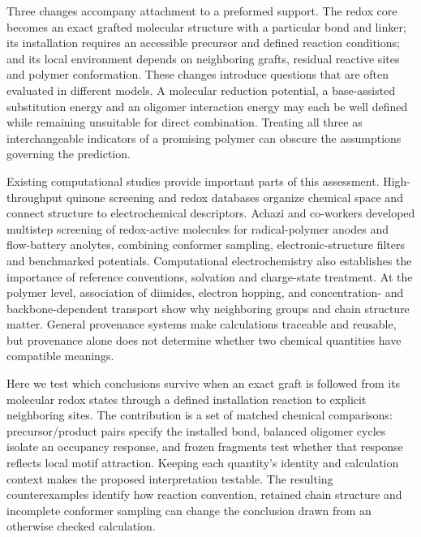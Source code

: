 \documentclass[11pt]{article}
\begin{document}
Three changes accompany attachment to a preformed support. The redox core becomes an exact grafted molecular structure with a particular bond and linker; its installation requires an accessible precursor and defined reaction conditions; and its local environment depends on neighboring grafts, residual reactive sites and polymer conformation. These changes introduce questions that are often evaluated in different models. A molecular reduction potential, a base-assisted substitution energy and an oligomer interaction energy may each be well defined while remaining unsuitable for direct combination. Treating all three as interchangeable indicators of a promising polymer can obscure the assumptions governing the prediction.

Existing computational studies provide important parts of this assessment. High-throughput quinone screening and redox databases organize chemical space and connect structure to electrochemical descriptors.\cite{er2015,d3tales2023,reddb2022} Achazi and co-workers developed multistep screening of redox-active molecules for radical-polymer anodes and flow-battery anolytes, combining conformer sampling, electronic-structure filters and benchmarked potentials.\cite{achazi2024screening} Computational electrochemistry also establishes the importance of reference conventions, solvation and charge-state treatment.\cite{marenich2014,fc2010,elhajj2024} At the polymer level, association of diimides, electron hopping, and concentration- and backbone-dependent transport show why neighboring groups and chain structure matter.\cite{wiberg2021,hopping2013,mohanty2026backbone} General provenance systems make calculations traceable and reusable, but provenance alone does not determine whether two chemical quantities have compatible meanings.\cite{aiida2020,fireworks2015,qcarchive2021}

Here we test which conclusions survive when an exact graft is followed from its molecular redox states through a defined installation reaction to explicit neighboring sites. The contribution is a set of matched chemical comparisons: precursor/product pairs specify the installed bond, balanced oligomer cycles isolate an occupancy response, and frozen fragments test whether that response reflects local motif attraction. Keeping each quantity's identity and calculation context makes the proposed interpretation testable. The resulting counterexamples identify how reaction convention, retained chain structure and incomplete conformer sampling can change the conclusion drawn from an otherwise checked calculation.
\end{document}
